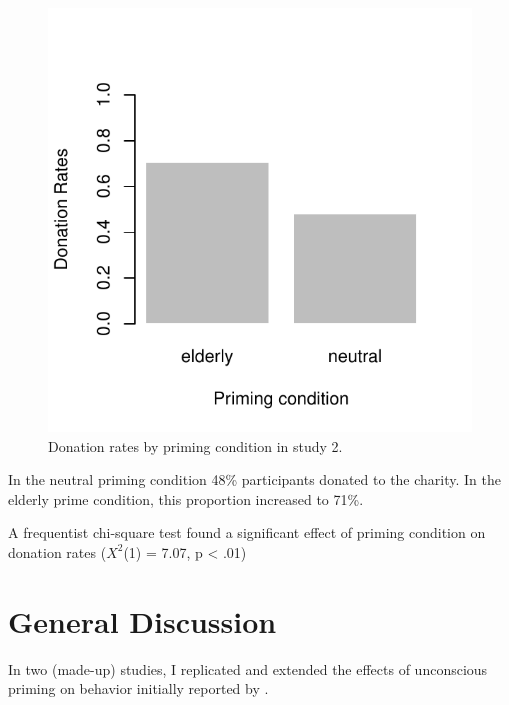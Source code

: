 \documentclass[a4paper,man,natbib,floatsintext]{apa6}\usepackage[]{graphicx}\usepackage[]{color}
\makeatletter
\def\maxwidth{ %
  \ifdim\Gin@nat@width>\linewidth
    \linewidth
  \else
    \Gin@nat@width
  \fi
}
\newenvironment{knitrout}{}{} %
\makeatother
\begin{document}
\begin{figure}
\begin{knitrout}
\color{fgcolor}

{\centering \includegraphics[width=\maxwidth]{figure/unnamed-chunk-7-1} 

}



\end{knitrout}
\caption{Donation rates by priming condition in study 2.}
\label{fig:s2donation}
\end{figure}



In the neutral priming condition 48\% participants donated to the charity. In the elderly prime condition, this proportion increased to  71\%.



A frequentist chi-square test found a significant effect of priming condition on donation rates ($X^{2}$(1) = 7.07, p < .01)


\section{General Discussion}

In two (made-up) studies, I replicated and extended the effects of unconscious priming on behavior initially reported by \cite{bargh1996automaticity}.
\end{document}
